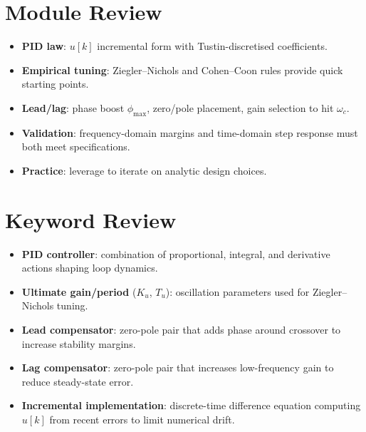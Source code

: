 \section{Module Review}
\begin{itemize}[leftmargin=*]
    \item \textbf{PID law}: $u[k]$ incremental form with Tustin-discretised coefficients.
    \item \textbf{Empirical tuning}: Ziegler--Nichols and Cohen--Coon rules provide quick starting points.
    \item \textbf{Lead/lag}: phase boost $\phi_{\max}$, zero/pole placement, gain selection to hit $\omega_c$.
    \item \textbf{Validation}: frequency-domain margins and time-domain step response must both meet specifications.
    \item \textbf{Practice}: leverage  to iterate on analytic design choices.
\end{itemize}

\section{Keyword Review}
\begin{vocabulary}
\begin{itemize}[leftmargin=*]
    \item \textbf{PID controller}: combination of proportional, integral, and derivative actions shaping loop dynamics.
    \item \textbf{Ultimate gain/period} ($K_u$, $T_u$): oscillation parameters used for Ziegler--Nichols tuning.
    \item \textbf{Lead compensator}: zero-pole pair that adds phase around crossover to increase stability margins.
    \item \textbf{Lag compensator}: zero-pole pair that increases low-frequency gain to reduce steady-state error.
    \item \textbf{Incremental implementation}: discrete-time difference equation computing $u[k]$ from recent errors to limit numerical drift.
\end{itemize}
\end{vocabulary}

